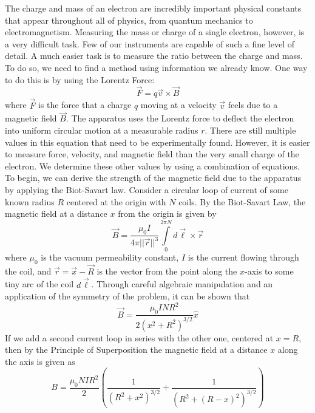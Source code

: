 \documentclass[prX,nofootinbib,notitlepage]{revtex4-1}
\begin{document}
The charge and mass of an electron are incredibly important physical constants that appear throughout all of physics, from quantum mechanics to electromagnetism. Measuring the mass or charge of a single electron, however, is a very difficult task. Few of our instruments are capable of such a fine level of detail. A much easier task is to measure the ratio between the charge and mass. To do so, we need to find a method using information we already know. One way to do this is by using the Lorentz Force:
\begin{equation}
\vec{F} = q\vec{v} \times \vec{B}
\end{equation}
where $\vec{F}$ is the force that a charge $q$ moving at a velocity $\vec{v}$ feels due to a magnetic field $\vec{B}$. The apparatus uses the Lorentz force to deflect the electron into uniform circular motion at a measurable radius $r$. There are still multiple values in this equation that need to be experimentally found. However, it is easier to measure force, velocity, and magnetic field than the very small charge of the electron. We determine these other values by using a combination of equations. To begin, we can derive the strength of the magnetic field due to the apparatus by applying the Biot-Savart law. Consider a circular loop of current of some known radius $R$ centered at the origin with $N$ coils. By the Biot-Savart Law, the magnetic field at a distance $x$ from the origin is given by
\begin{equation}
\vec{B} = \frac{\mu_{0} I}{4 \pi ||\vec{r}||^{3} } \int\limits_{0}^{2\pi N}{d\vec{\ell} \times \vec{r}}
\end{equation}
where $\mu_0$ is the vacuum permeability constant, $I$ is the current flowing through the coil, and $\vec{r} = \vec{x} - \vec{R}$ is the vector from the point along the $x$-axis to some tiny arc of the coil $d\vec{\ell}$. Through careful algebraic manipulation and an application of the symmetry of the problem, it can be shown that 
\begin{equation}
\vec{B} = \frac{\mu_{0} I N R^{2}}{2(x^{2} + R^{2})^{3/2}} \hat{x}
\end{equation}
If we add a second current loop in series with the other one, centered at $x = R$, then by the Principle of Superposition the magnetic field at a distance $x$ along the axis is given as
\begin{equation}
B = \frac{\mu_{0} N I R^{2}}{2} \left( \frac{1}{(R^{2} + x^{2})^{3/2}} + \frac{1}{(R^{2} + (R-x)^{2})^{3/2}} \right)
\end{equation}
\end{document}
